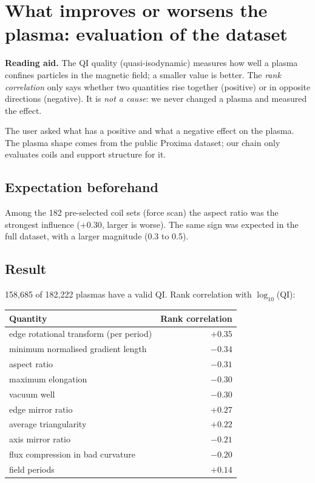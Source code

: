 \section{What improves or worsens the plasma: evaluation of the dataset}\label{sec:qi_einfluss}

\textbf{Reading aid.} The QI quality (quasi-isodynamic) measures how well a plasma confines particles in the magnetic
field; a smaller value is better. The \emph{rank correlation} only says whether two quantities rise together (positive)
or in opposite directions (negative). It is \emph{not a cause}: we never changed a plasma and measured the effect.

The user asked what has a positive and what a negative effect on the plasma. The plasma shape comes from the public
Proxima dataset; our chain only evaluates coils and support structure for it.

\subsection*{Expectation beforehand}
Among the 182 pre-selected coil sets (force scan) the aspect ratio was the strongest influence (+0.30, larger is worse).
The same sign was expected in the full dataset, with a larger magnitude (0.3 to 0.5).

\subsection*{Result}
158,685 of 182,222 plasmas have a valid QI. Rank correlation with $\log_{10}$(QI):

\begin{tabular}{lr}
\hline
Quantity & Rank correlation \\ \hline
edge rotational transform (per period) & $+0.35$ \\
minimum normalised gradient length & $-0.34$ \\
aspect ratio & $-0.31$ \\
maximum elongation & $-0.30$ \\
vacuum well & $-0.30$ \\
edge mirror ratio & $+0.27$ \\
average triangularity & $+0.22$ \\
axis mirror ratio & $-0.21$ \\
flux compression in bad curvature & $-0.20$ \\
field periods & $+0.14$ \\ \hline
\end{tabular}


